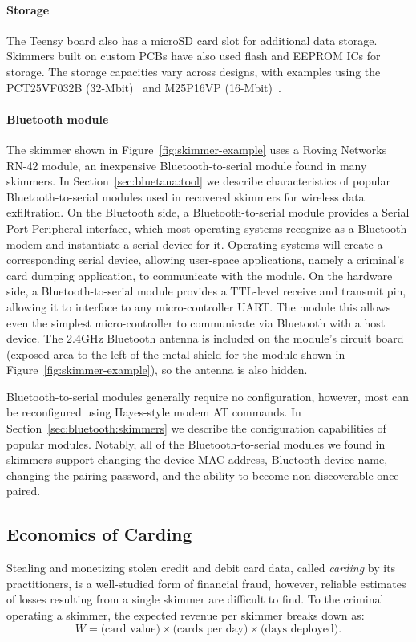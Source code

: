 \paragraph{Storage} The Teensy board also has a microSD card slot for additional data storage. Skimmers built on custom PCBs have also used flash and EEPROM ICs for storage. The storage capacities vary across designs, with examples using the PCT25VF032B (32-Mbit)~\cite{customshimmer} and M25P16VP (16-Mbit)~\cite{sparkfunapp}.

\paragraph{Bluetooth module} The skimmer shown in Figure~\ref{fig:skimmer-example} uses a Roving Networks RN-42 module, an inexpensive Bluetooth-to-serial module found in many skimmers. In Section~\ref{sec:bluetana:tool} we describe characteristics of popular Bluetooth-to-serial modules used in recovered skimmers for wireless data exfiltration. On the Bluetooth side, a Bluetooth-to-serial module provides a Serial Port Peripheral interface, which most operating systems recognize as a Bluetooth modem and instantiate a serial device for it. Operating systems will create a corresponding serial device, allowing user-space applications, namely a criminal's card dumping application, to communicate with the module. On the hardware side, a Bluetooth-to-serial module provides a TTL-level receive and transmit pin, allowing it to interface to any micro-controller UART. The module this allows even the simplest micro-controller to communicate via Bluetooth with a host device. The 2.4GHz Bluetooth antenna is included on the module's circuit board (exposed area to the left of the metal shield for the module shown in Figure~\ref{fig:skimmer-example}), so the antenna is also hidden.

Bluetooth-to-serial modules generally require no configuration, however, most
can be reconfigured using Hayes-style modem AT commands. In
Section~\ref{sec:bluetooth:skimmers} we describe the configuration capabilities
of popular modules. Notably, all of the Bluetooth-to-serial modules we found in
skimmers support changing the device MAC address, Bluetooth device name,
changing the pairing password, and the ability to become non-discoverable once
paired.

\subsection{Economics of Carding}
\label{sec:background:money}
Stealing and monetizing stolen credit and debit card data, called \emph{carding} by its practitioners, is a well-studied
form of financial fraud, however, reliable estimates of losses resulting from a single skimmer are difficult to find. To the criminal operating a skimmer, the expected revenue per skimmer breaks down as:
%
\[W = \textrm{(card value)}
\times \textrm{(cards per day)}
\times \textrm{(days deployed)}.\]


